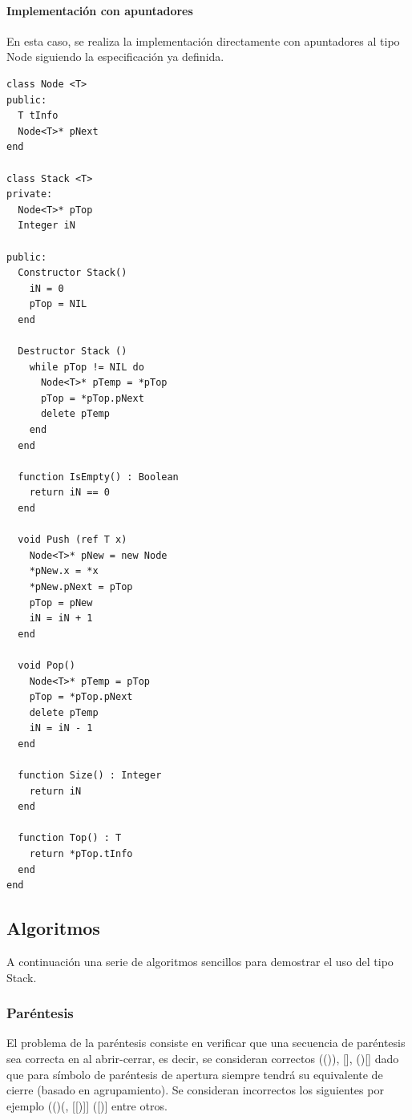 \paragraph{Implementación con apuntadores}

En esta caso, se realiza la implementación directamente con apuntadores al tipo Node siguiendo la especificación ya definida.

\begin{lstlisting}[upquote=true, language=pseudo]
class Node <T>
public:
  T tInfo
  Node<T>* pNext
end

class Stack <T>
private:
  Node<T>* pTop
  Integer iN

public:
  Constructor Stack()
    iN = 0
    pTop = NIL
  end

  Destructor Stack ()
    while pTop != NIL do
      Node<T>* pTemp = *pTop
      pTop = *pTop.pNext
      delete pTemp
	end
  end

  function IsEmpty() : Boolean
    return iN == 0
  end

  void Push (ref T x)
    Node<T>* pNew = new Node
    *pNew.x = *x
    *pNew.pNext = pTop
    pTop = pNew
    iN = iN + 1
  end

  void Pop()
    Node<T>* pTemp = pTop
    pTop = *pTop.pNext
    delete pTemp
    iN = iN - 1
  end

  function Size() : Integer
    return iN
  end

  function Top() : T
    return *pTop.tInfo
  end
end
\end{lstlisting}

\subsection{Algoritmos}

A continuación una serie de algoritmos sencillos para demostrar el uso del tipo Stack.

\subsubsection{Paréntesis}

El problema de la paréntesis consiste en verificar que una secuencia de paréntesis sea correcta en al abrir-cerrar, es decir, se consideran correctos (()), [{}], {()[]} dado que para símbolo de paréntesis de apertura siempre tendrá su equivalente de cierre (basado en agrupamiento). Se consideran incorrectos los siguientes por ejemplo (()(, [[)]] ([)] entre otros.

